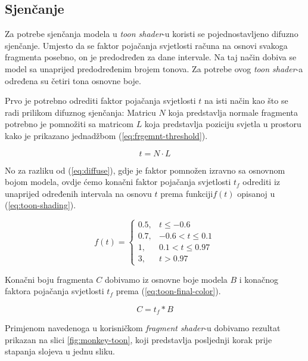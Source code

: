 \subsection{Sjenčanje}

Za potrebe sjenčanja modela u \emph{toon shader}-u koristi se pojednostavljeno difuzno sjenčanje. Umjesto da se faktor pojačanja svjetlosti računa na osnovi svakoga fragmenta posebno, on je predodređen za dane intervale. Na taj način dobiva se model sa unaprijed predodređenim brojem tonova. Za potrebe ovog \emph{toon shader}-a određena su četiri tona osnovne boje.

Prvo je potrebno odrediti faktor pojačanja svjetlosti $t$ na isti način kao što se radi prilikom difuznog sjenčanja: Matricu $N$ koja predstavlja normale fragmenta potrebno je pomnožiti sa matricom $L$ koja predstavlja poziciju svjetla u prostoru kako je prikazano jednadžbom (\ref{eq:frgemnt-threshold}).

\begin{equation}
\label{eq:frgemnt-threshold}
t = N \cdot L
\end{equation}

No za razliku od (\ref{eq:diffuse}), gdje je faktor pomnožen izravno sa osnovnom bojom modela, ovdje ćemo konačni faktor pojačanja svjetlosti $t_f$ odrediti iz unaprijed određenih intervala na osnovu $t$ prema funkciji$f(t)$ opisanoj u (\ref{eq:toon-shading}).

\begin{equation}
\label{eq:toon-shading}
	f(t) =
	\begin{cases}
		0.5, & t \leq -0.6 \\
		0.7, & -0.6 < t \leq 0.1 \\
		1, & 0.1 < t \leq 0.97 \\
		3, & t > 0.97
	\end{cases}
\end{equation}

Konačni boju fragmenta $C$ dobivamo iz osnovne boje modela $B$ i konačnog faktora pojačanja svjetlosti $t_f$ prema (\ref{eq:toon-final-color}).

\begin{equation}
\label{eq:toon-final-color}
	C = t_f * B
\end{equation}

Primjenom navedenoga u korisničkom \emph{fragment shader}-u dobivamo rezultat prikazan na slici \ref{fig:monkey-toon}, koji predstavlja posljednji korak prije stapanja slojeva u jednu sliku.

